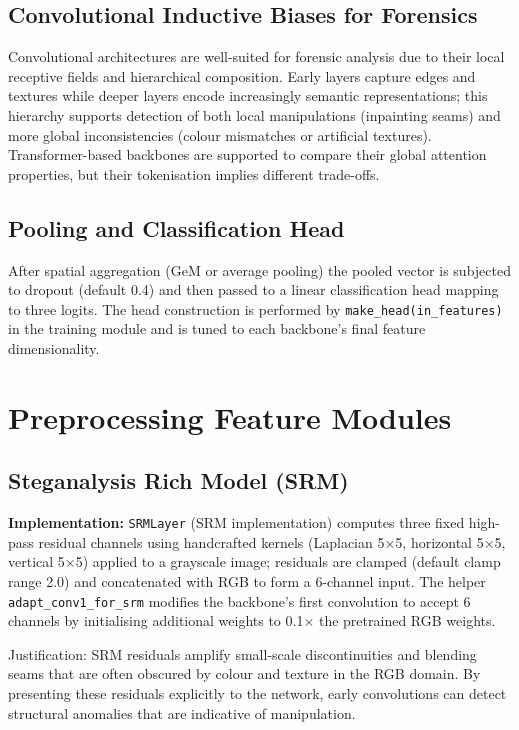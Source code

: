\documentclass[11pt]{report}
\begin{document}
\subsection{Convolutional Inductive Biases for Forensics}
Convolutional architectures are well-suited for forensic analysis due to their
local receptive fields and hierarchical composition. Early layers capture
edges and textures while deeper layers encode increasingly semantic
representations; this hierarchy supports detection of both local manipulations
(inpainting seams) and more global inconsistencies (colour mismatches or
artificial textures). Transformer-based backbones are supported to compare
their global attention properties, but their tokenisation implies different
trade-offs.

\subsection{Pooling and Classification Head}
After spatial aggregation (GeM or average pooling) the pooled vector is
subjected to dropout (default 0.4) and then passed to a linear classification
head mapping to three logits. The head construction is performed by
\texttt{make_head(in_features)} in the training module and
is tuned to each backbone's final feature dimensionality.

\section{Preprocessing Feature Modules}
\subsection{\textbf{Steganalysis Rich Model (SRM)}}
\textbf{Implementation:} \texttt{SRMLayer} (SRM implementation)
computes three fixed high-pass residual channels using handcrafted kernels
(Laplacian 5×5, horizontal 5×5, vertical 5×5) applied to a grayscale image;
residuals are clamped (default clamp range 2.0) and concatenated with RGB to
form a 6-channel input. The helper \texttt{adapt_conv1_for_srm} modifies the
backbone's first convolution to accept 6 channels by initialising additional
weights to 0.1× the pretrained RGB weights.

Justification: SRM residuals amplify small-scale discontinuities and blending
seams that are often obscured by colour and texture in the RGB domain. By
presenting these residuals explicitly to the network, early convolutions can
detect structural anomalies that are indicative of manipulation.
\end{document}
